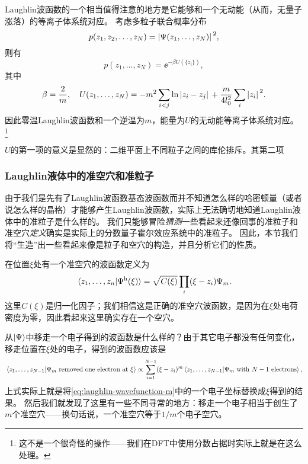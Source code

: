 Laughlin波函数的一个相当值得注意的地方是它能够和一个无动能（从而，无量子涨落）的等离子体系统对应。
考虑多粒子联合概率分布
\begin{equation}
    p(z_1, z_2, \ldots, z_N) = \abs*{\Psi(z_1, \ldots, z_N)}^2,
\end{equation}
则有
\begin{equation}
    p(z_1, \ldots, z_N) = \ee^{- \beta U(\{z_i\})},
\end{equation}
其中
\begin{equation}
    \beta = \frac{2}{m}, \quad U(z_1, \ldots, z_N) = - m^2 \sum_{i < j} \ln \abs*{z_i - z_j} + \frac{m}{4 l_0^2} \sum_i \abs*{z_i}^2.
\end{equation}
因此零温Laughlin波函数和一个逆温为$m$，能量为$U$的无动能等离子体系统对应。%
\footnote{
    这不是一个很奇怪的操作——我们在DFT中使用分数占据时实际上就是在这么处理。
}%

$U$的第一项的意义是显然的：二维平面上不同粒子之间的库伦排斥。其第二项

\subsubsection{Laughlin液体中的准空穴和准粒子}

由于我们是先有了Laughlin波函数基态波函数而并不知道怎么样的哈密顿量（或者说怎么样的晶格）才能够产生Laughlin波函数，实际上无法确切地知道Laughlin液体中的准粒子是什么样的。
我们只能够冒险\emph{猜测}一些看起来还像回事的准粒子和准空穴\emph{定义}确实是实际上的分数量子霍尔效应系统中的准粒子。
因此，本节我们将“生造”出一些看起来像是粒子和空穴的构造，并且分析它们的性质。

在位置$\xi$处有一个准空穴的波函数定义为
\begin{equation}
    \braket*{z_1, \ldots, z_n}{\Psi^\text{h}(\xi)} = \sqrt{C(\xi)} \prod_i (\xi - z_i) \Psi_m.
\end{equation}
这里$C(\xi)$是归一化因子；我们相信这是正确的准空穴波函数，是因为在$\xi$处电荷密度为零，因此看起来这里确实存在一个空穴。

从$\ket{\Psi}$中移走一个电子得到的波函数是什么样的？由于其它电子都没有任何变化，移走位置在$\xi$处的电子，得到的波函数应该是
\begin{equation}
    \braket*{z_1, \ldots, z_{N-1}}{\Psi_m \text{ removed one electron at $\xi$}} \propto \sum_{i=1}^{N-1} (\xi - z_i)^m \braket*{z_1, \ldots, z_{N-1}}{\Psi_m \text{ with $N-1$ electrons}},
\end{equation}
上式实际上就是将\eqref{eq:laughlin-wavefunction-m}中的一个电子坐标替换成$\xi$得到的结果。
然后我们就发现了这里有一些不同寻常的地方：移走一个电子相当于创生了$m$个准空穴——换句话说，一个准空穴等于$1/m$个电子空穴。

